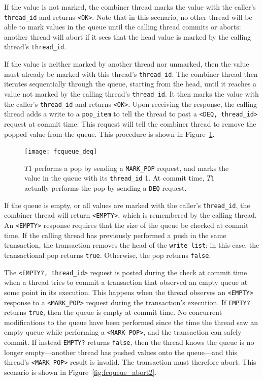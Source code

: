 If the value is not marked, the combiner thread marks the value with the caller's \texttt{thread\_id} and returns \texttt{<OK>}. Note that in this scenario, no other thread will be able to mark values in the queue until the calling thread commits or aborts: another thread will abort if it sees that the head value is marked by the calling thread's \texttt{thread\_id}. 

If the value is neither marked by another thread nor unmarked, then the value must already be marked with this thread's \texttt{thread\_id}. The combiner thread then iterates sequentially through the queue, starting from the head, until it reaches a value not marked by the calling thread's \texttt{thread\_id}. It then marks the value with the caller's \texttt{thread\_id} and returns \texttt{<OK>}. Upon receiving the response, the calling thread adds a write to a \texttt{pop\_item} to tell the thread to post a \texttt{<DEQ, thread\_id>} request at commit time. This request will tell the combiner thread to remove the popped value from the queue. This procedure is shown in Figure~\ref{fig:fcqueue_deq}.

\begin{figure}[t]
\centering
\texttt{[image: fcqueue\_deq]}
    \caption[Transactional flat combining pop request execution]{$T1$ performs a pop by sending a \texttt{MARK\_POP} request, and marks the value in the queue with its \texttt{thread\_id} 1. At commit time, $T1$ actually performs the pop by sending a \texttt{DEQ} request.} 
\label{fig:fcqueue_deq}
\end{figure}

If the queue is empty, or all values are marked with the caller's \texttt{thread\_id}, the combiner thread will return \texttt{<EMPTY>}, which is remembered by the calling thread. An \texttt{<EMPTY>} response requires that the size of the queue be checked at commit time. If the calling thread has previously performed a push in the same transaction, the transaction removes the head of the \texttt{write\_list}; in this case, the transactional pop returns \texttt{true}. Otherwise, the pop returns \texttt{false}.


The \texttt{<EMPTY?, thread\_id>} request is posted during the check at commit time when a thread tries to commit a transaction that observed an empty queue at some point in its execution. This happens when the thread observes an \texttt{<EMPTY>} response to a \texttt{<MARK\_POP>} request during the transaction's execution. If \texttt{EMPTY?} returns \texttt{true}, then the queue is empty at commit time. No concurrent modifications to the queue have been performed since the time the thread saw an empty queue while performing a \texttt{<MARK\_POP>}, and the transaction can safely commit. If instead \texttt{EMPTY?} returns \texttt{false}, then the thread knows the queue is no longer empty---another thread has pushed values onto the queue---and this thread's \texttt{<MARK\_POP>} result is invalid. The transaction must therefore abort. This scenario is shown in Figure~\ref{fig:fcqueue_abort2}.

